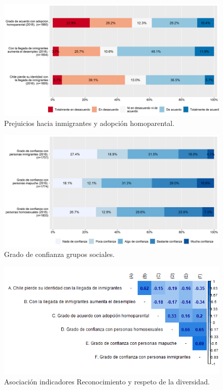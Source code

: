 \documentclass[
  12pt,
]{book}
\begin{document}
\begin{figure}[H]

{\centering \includegraphics[width=1\linewidth,height=1\textheight]{output/graphs/prejuicios} 

}

\caption{Prejuicios hacia inmigrantes y adopción homoparental.}\label{fig:prejuicios}
\end{figure}

\begin{figure}[H]

{\centering \includegraphics[width=1\linewidth,height=1\textheight]{output/graphs/diversidad} 

}

\caption{Grado de confianza grupos sociales.}\label{fig:diversidad}
\end{figure}

\begin{figure}[H]

{\centering \includegraphics[width=1\linewidth,height=1\textheight]{output/graphs/diversidad_cor} 

}

\caption{Asociación indicadores Reconocimiento y respeto de la diversidad.}\label{fig:diversidad-cor}
\end{figure}
\end{document}
